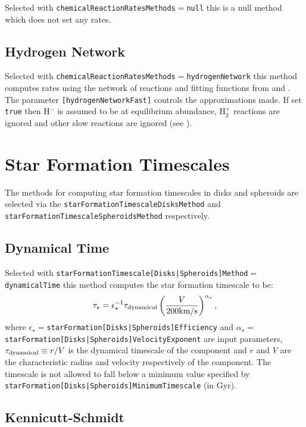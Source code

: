 Selected with {\tt chemicalReactionRatesMethods}$=${\tt null} this is a null method which does not set any rates.

\subsection{Hydrogen Network}

Selected with {\tt chemicalReactionRatesMethods}$=${\tt hydrogenNetwork} this method computes rates using the network of reactions and fitting functions from \cite{abel_modeling_1997} and \cite{tegmark_small_1997}. The parameter {\tt [hydrogenNetworkFast]} controls the approximations made. If set {\tt true} then H$^-$ is assumed to be at equilibrium abundance, H$_2^+$ reactions are ignored and other slow reactions are ignored (see \citealt{abel_modeling_1997}).

\section{Star Formation Timescales}

The methods for computing star formation timescales in disks and spheroids are selected via the {\tt starFormationTimescaleDisksMethod} and {\tt starFormationTimescaleSpheroidsMethod} respectively.

\subsection{Dynamical Time}

Selected with {\tt starFormationTimescale[Disks|Spheroids]Method}$=${\tt dynamicalTime} this method computes the star formation timescale to be:
\begin{equation}
 \tau_\star = \epsilon_\star^{-1} \tau_{\rm dynamical} \left( {V \over 200\hbox{km/s}} \right)^{\alpha_\star},
\end{equation}
where $\epsilon_\star=${\tt starFormation[Disks|Spheroids]Efficiency} and $\alpha_\star=${\tt starFormation[Disks|Spheroids]VelocityExponent} are input parameters, $\tau_{\rm dynamical}\equiv r/V$ is the dynamical timescale of the \gls{component} and $r$ and $V$ are the characteristic radius and velocity respectively of the component. The timescale is not allowed to fall below a minimum value specified by {\tt starFormation[Disks|Spheroids]MinimumTimescale} (in Gyr).

\subsection{Kennicutt-Schmidt}\label{sec:StarFormationKennicuttSchmidt}

